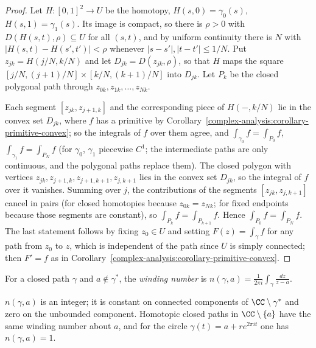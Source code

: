 \begin{proof}
Let $H \colon [0, 1]^2 \to U$ be the homotopy, $H(s, 0) = \gamma_0(s)$, $H(s, 1) = \gamma_1(s)$. Its image is compact, so there is $\rho > 0$ with $D(H(s, t), \rho) \subseteq U$ for all $(s, t)$, and by uniform
continuity there is $N$ with $|H(s, t) - H(s', t')| < \rho$ whenever $|s - s'|, |t - t'| \leq 1/N$. Put $z_{jk} = H(j/N, k/N)$ and let $D_{jk} = D(z_{jk}, \rho)$, so that $H$ maps the square
$[j/N, (j+1)/N] \times [k/N, (k+1)/N]$ into $D_{jk}$. Let $P_k$ be the closed polygonal path through $z_{0k}, z_{1k}, \ldots, z_{Nk}$.

Each segment $[z_{jk}, z_{j+1,k}]$ and the corresponding piece of $H(-, k/N)$ lie in the convex set $D_{jk}$, where $f$ has a primitive by Corollary~\ref{complex-analysis:corollary-primitive-convex}; so the
integrals of $f$ over them agree, and $\int_{\gamma_0}f = \int_{P_0}f$, $\int_{\gamma_1}f = \int_{P_N}f$ (for $\gamma_0$, $\gamma_1$ piecewise $C^1$; the intermediate paths are only continuous, and the
polygonal paths replace them). The closed polygon with vertices $z_{jk}, z_{j+1,k}, z_{j+1,k+1}, z_{j,k+1}$ lies in the convex set $D_{jk}$, so the integral of $f$ over it vanishes. Summing over $j$, the
contributions of the segments $[z_{jk}, z_{j,k+1}]$ cancel in pairs (for closed homotopies because $z_{0k} = z_{Nk}$; for fixed endpoints because those segments are constant), so
$\int_{P_k}f = \int_{P_{k+1}}f$. Hence $\int_{P_0}f = \int_{P_N}f$. The last statement follows by fixing $z_0 \in U$ and setting $F(z) = \int_\gamma f$ for any path from $z_0$ to $z$, which is independent
of the path since $U$ is simply connected; then $F' = f$ as in Corollary~\ref{complex-analysis:corollary-primitive-convex}.
\end{proof}

\begin{definition}\label{complex-analysis:definition-winding-number}
For a closed path $\gamma$ and $a \notin \gamma^*$, the \emph{winding number} is $n(\gamma, a) = \frac{1}{2\pi i}\int_\gamma\frac{dz}{z - a}$.
\end{definition}

\begin{proposition}\label{complex-analysis:proposition-winding-number}
$n(\gamma, a)$ is an integer; it is constant on connected components of $\CC \setminus \gamma^*$ and zero on the unbounded component. Homotopic closed paths in $\CC \setminus \{a\}$ have the same winding
number about $a$, and for the circle $\gamma(t) = a + re^{2\pi it}$ one has $n(\gamma, a) = 1$.
\end{proposition}

